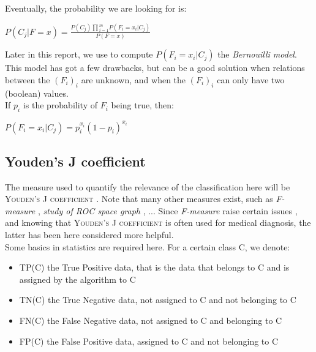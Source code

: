 \documentclass{report}
\begin{document}
Eventually, the probability we are looking for is:\\

\begin{center}
$P(C_{j} | F = x) = \frac{P(C_{j})\prod{_{i = 1}^{m}}{P(F_{i} = x_{i} | C_{j})}}{P(F = x)}$\\ 
\end{center}

Later in this report, we use to compute $P(F_{i} = x_{i} | C_{j})$ the \emph{Bernouilli model}. This model has got a few drawbacks, but can be a good solution when relations between the $(F_{i})_{i}$ are unknown, and when the $(F_{i})_{i}$ can only have two (boolean) values.\\

If $p_{i}$ is the probability of $F_{i}$ being true, then:\\
\begin{center}
$P(F_{i} = x_{i} | C_{j}) = p_{i}^{x_{i}}(1 - p_{i})^{x_{i}}$
\end{center}

\subsection{Youden's J coefficient}

The measure used to quantify the relevance of the classification here will be \textsc{Youden's J coefficient} \cite{Youden}. Note that many other measures exist, such as \emph{F-measure} \cite{F-measure}, \emph{study of ROC space graph} \cite{IntroROC}, ... Since \emph{F-measure} raise certain issues \cite{FMproblems}, and knowing that \textsc{Youden's J coefficient} is often used for medical diagnosis, the latter has been here considered more helpful.\\

Some basics in statistics are required here. For a certain class \textsc{C}, we denote:
\begin{itemize}
\item \textsc{TP(C)} the True Positive data, that is the data that belongs to \textsc{C} and is assigned by the algorithm to \textsc{C}
\item \textsc{TN(C)} the True Negative data, not assigned to \textsc{C} and not belonging to \textsc{C}
\item \textsc{FN(C)} the False Negative data, not assigned to \textsc{C} and belonging to \textsc{C}
\item \textsc{FP(C)} the False Positive data, assigned to \textsc{C} and not belonging to \textsc{C}
\end{itemize}
\end{document}
